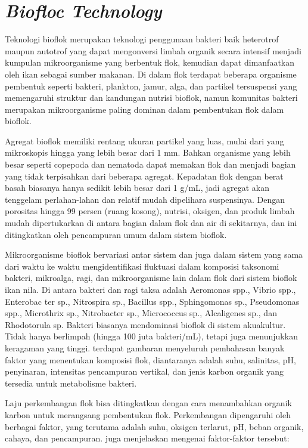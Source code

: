 \section{\emph{Biofloc Technology}}

Teknologi bioflok merupakan teknologi penggunaan bakteri baik heterotrof maupun autotrof yang dapat mengonversi limbah organik secara intensif menjadi kumpulan mikroorganisme yang berbentuk flok, kemudian dapat dimanfaatkan oleh ikan sebagai sumber makanan. Di dalam flok terdapat beberapa organisme pembentuk seperti bakteri, plankton, jamur, alga, dan partikel tersuspensi yang memengaruhi struktur dan kandungan nutrisi bioflok, namun komunitas bakteri merupakan mikroorganisme paling dominan dalam pembentukan flok dalam bioflok. 

Agregat bioflok memiliki rentang ukuran partikel yang luas, mulai dari yang mikroskopis hingga yang lebih besar dari 1 mm. Bahkan organisme yang lebih besar seperti copepoda dan nematoda dapat memakan flok dan menjadi bagian yang tidak terpisahkan dari beberapa agregat. Kepadatan flok dengan berat basah biasanya hanya sedikit lebih besar dari 1 g/mL, jadi agregat akan tenggelam perlahan-lahan dan relatif mudah dipelihara suspensinya. Dengan porositas hingga 99 persen (ruang kosong), nutrisi, oksigen, dan produk limbah mudah dipertukarkan di antara bagian dalam flok dan air di sekitarnya, dan ini ditingkatkan oleh pencampuran umum dalam sistem bioflok\citep{samocha2019}.

Mikroorganisme bioflok bervariasi antar sistem dan juga dalam sistem yang sama dari waktu ke waktu mengidentifikasi fluktuasi dalam komposisi taksonomi bakteri, mikroalga, ragi, dan mikroorganisme lain dalam flok dari sistem bioflok ikan nila. Di antara bakteri dan ragi taksa adalah Aeromonas spp., Vibrio spp., Enterobac ter sp., Nitrospira sp., Bacillus spp., Sphingomonas sp., Pseudomonas spp., Microthrix sp., Nitrobacter sp., Micrococcus sp., Alcaligenes sp., dan Rhodotorula sp. Bakteri biasanya mendominasi bioflok di sistem akuakultur. Tidak hanya berlimpah (hingga 100 juta bakteri/mL), tetapi juga menunjukkan keragaman yang tinggi. terdapat gambaran menyeluruh pembahasan banyak faktor yang menentukan komposisi flok, diantaranya adalah suhu, salinitas, pH, penyinaran, intensitas pencampuran vertikal, dan jenis karbon organik yang tersedia untuk metabolisme bakteri.

Laju perkembangan flok bisa ditingkatkan dengan cara menambahkan organik karbon untuk merangsang pembentukan flok. Perkembangan dipengaruhi oleh berbagai faktor, yang terutama adalah suhu, oksigen terlarut, pH, beban organik, cahaya, dan pencampuran. \citep{samocha2019} juga menjelaskan mengenai faktor-faktor tersebut:

